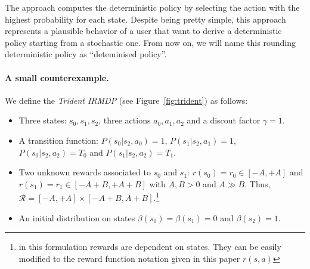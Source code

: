 The approach computes the deterministic policy by selecting the action with the highest probability for each state. Despite being pretty simple, this approach represents a plausible behavior of a user that want to derive a deterministic policy starting from a stochastic one. From now on, we will name this rounding deterministic policy as ``deteminised policy''.
%
%
%
%
%

\paragraph{\textbf{A small counterexample.}}%

We define the \textit{Trident IRMDP} (see Figure~\ref{fig:trident}) as follows:
\begin{itemize}
\item Three states: $s_0, s_1, s_2$, three actions $a_0, a_1, a_2$ and a discout factor $\gamma=1$.
\item A transition function: $P(s_0 | s_2,a_0)=1$, $P(s_1 |s_2 ,a_1)=1$, $P(s_0 | s_2, a_2) = T_0$ and $P(s_1 | s_2, a_2) = T_1$.
\item Two unknown rewards associated to $s_0$ and $s_1$: $r(s_0)= r_0 \in [-A,+A]$ and $r(s_1)= r_1 \in [-A+B,+A+B]$ with $A,B > 0$ and $A \gg B$. Thus, $\mathcal{R} = [-A, +A]\times[-A+B, A+B]$.\footnote{in this formulation rewards are dependent on states. They can be easily modified to the reward function notation given in this paper $r(s, a)$} 	 
\item An initial distribution on states $\beta(s_0)= \beta(s_1) = 0$ and $\beta(s_2)=1$.

\end{itemize} 



